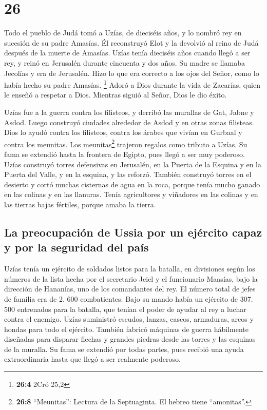 \hypertarget{section-25}{%
\section{26}\label{section-25}}

 Todo el pueblo de Judá tomó a Uzías, de dieciséis años, y
lo nombró rey en sucesión de su padre Amasías.  Él
reconstruyó Elot y la devolvió al reino de Judá después de la muerte de
Amasías.  Uzías tenía dieciséis años cuando llegó a ser
rey, y reinó en Jerusalén durante cincuenta y dos años. Su madre se
llamaba Jecolías y era de Jerusalén.  Hizo lo que era
correcto a los ojos del Señor, como lo había hecho su padre Amasías.
\footnote{\textbf{26:4} 2Cró 25,2}  Adoró a Dios durante
la vida de Zacarías, quien le enseñó a respetar a Dios. Mientras siguió
al Señor, Dios le dio éxito.

 Uzías fue a la guerra contra los filisteos, y derribó las
murallas de Gat, Jabne y Asdod. Luego construyó ciudades alrededor de
Asdod y en otras zonas filisteas.  Dios lo ayudó contra
los filisteos, contra los árabes que vivían en Gurbaal y contra los
meunitas.  Los meunitas\footnote{\textbf{26:8}
  ``Meunitas'': Lectura de la Septuaginta. El hebreo tiene ``amonitas''.}
trajeron regalos como tributo a Uzías. Su fama se extendió hasta la
frontera de Egipto, pues llegó a ser muy poderoso.  Uzías
construyó torres defensivas en Jerusalén, en la Puerta de la Esquina y
en la Puerta del Valle, y en la esquina, y las reforzó. 
También construyó torres en el desierto y cortó muchas cisternas de agua
en la roca, porque tenía mucho ganado en las colinas y en las llanuras.
Tenía agricultores y viñadores en las colinas y en las tierras bajas
fértiles, porque amaba la tierra.

\hypertarget{la-preocupaciuxf3n-de-ussia-por-un-ejuxe9rcito-capaz-y-por-la-seguridad-del-pauxeds}{%
\subsection{La preocupación de Ussia por un ejército capaz y por la
seguridad del
país}\label{la-preocupaciuxf3n-de-ussia-por-un-ejuxe9rcito-capaz-y-por-la-seguridad-del-pauxeds}}

 Uzías tenía un ejército de soldados listos para la
batalla, en divisiones según los números de la lista hecha por el
secretario Jeiel y el funcionario Maasías, bajo la dirección de
Hananías, uno de los comandantes del rey.  El número
total de jefes de familia era de 2. 600 combatientes. 
Bajo su mando había un ejército de 307. 500 entrenados para la batalla,
que tenían el poder de ayudar al rey a luchar contra el enemigo.
 Uzías suministró escudos, lanzas, cascos, armaduras,
arcos y hondas para todo el ejército.  También fabricó
máquinas de guerra hábilmente diseñadas para disparar flechas y grandes
piedras desde las torres y las esquinas de la muralla. Su fama se
extendió por todas partes, pues recibió una ayuda extraordinaria hasta
que llegó a ser realmente poderoso.

